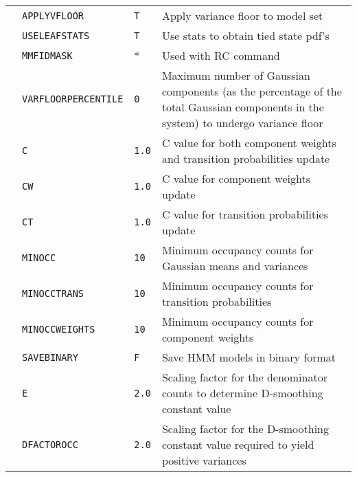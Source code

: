\begin{center}
\begin{supertabular}{|p{1.8cm}|l|l|p{6.6cm}|}
  & \texttt{APPLYVFLOOR} & \texttt{T} & Apply variance floor to model set \\  


  & \texttt{USELEAFSTATS} & \texttt{T} & Use stats to obtain tied state pdf's \\ 


  & \texttt{MMFIDMASK} & * & Used with RC  command \\


 \hline







& \texttt{VARFLOORPERCENTILE} & \texttt{0} & Maximum number of Gaussian components (as the percentage of the total Gaussian components in the system) to undergo variance floor \\ 


& \texttt{C} & \texttt{1.0} & C value for both component weights and transition probabilities update \\ 


& \texttt{CW} & \texttt{1.0} & C value for component weights update\\ 


& \texttt{CT} & \texttt{1.0} & C value for transition probabilities update\\ 


& \texttt{MINOCC} & \texttt{10} & Minimum occupancy counts for Gaussian means and variances \\ 


& \texttt{MINOCCTRANS} & \texttt{10} & Minimum occupancy counts for transition probabilities \\ 


& \texttt{MINOCCWEIGHTS} & \texttt{10} & Minimum occupancy counts for component weights \\ 


& \texttt{SAVEBINARY} & \texttt{F} & Save HMM models in binary format \\ 


& \texttt{E} & \texttt{2.0} & Scaling factor for the denominator counts to determine D-smoothing constant value \\ 




& \texttt{DFACTOROCC} & \texttt{2.0} & Scaling factor for the D-smoothing constant value required to yield positive variances \\ 



\end{supertabular}
\end{center}
